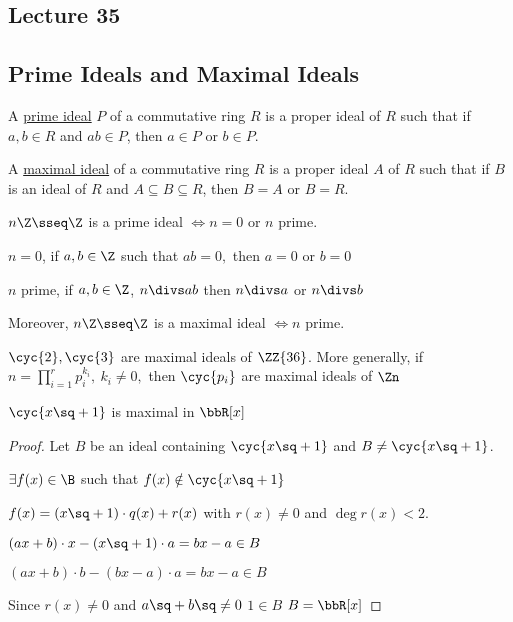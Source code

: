 \subsection*{Lecture 35} %
\subsection{Prime Ideals and Maximal Ideals}

\begin{definition}
  A \ul{prime ideal} \( P \) of a commutative ring \( R \) is a proper ideal of \( R \) such that if \( a,b\in R \) and \( ab\in P \), then \( a\in P \) or \( b\in P \).

  A \ul{maximal ideal} of a commutative ring \( R \) is a proper ideal \( A \) of \( R \) such that if \( B \) is an ideal of \( R \) and \( A\subseteq B\subseteq R \), then \( B=A \) or \( B=R \).
\end{definition}

\begin{example}
  \( n\Z \sseq \Z \) is a prime ideal \( \iff n=0 \) or \( n \) prime.

  \begin{note}
    \( n = 0 \), if \( a,b\in \Z \) such that \( ab = 0, \) then \( a=0 \) or \( b=0 \) \checkmark

    \( n \) prime, if \( a,b\in\Z \), \( n\divs ab \) then \( n\divs a  \) or \( n\divs b \) \checkmark
  \end{note}
  Moreover, \( n\Z\sseq\Z \) is a maximal ideal \( \iff n \) prime.
\end{example}

\begin{example}
  \( \cyc{2}, \cyc{3} \) are maximal ideals of \( \ZZ{36} \). More generally, if \( n=\prod_{i=1}^{r} p_{i}^{k_{i}},\ k_i\neq 0,\) then \( \cyc{p_i} \) are maximal ideals of \( \Zn \)
\end{example}

\begin{example}
  \( \cyc{x\sq +1} \) is maximal in \( \bbR[x] \)
\end{example}

\begin{proof}
  Let \( B \) be an ideal containing \( \cyc{x\sq + 1} \) and \( B\neq \cyc{x\sq + 1} \).

  \imp \( \exists f(x) \in\B \) such that \( f(x) \notin \cyc{x\sq + 1} \)

  \imp \( f(x) = (x\sq+1) \cdot q(x) + r(x) \) with \( r(x)\neq 0 \) and \( \deg r(x) <2 \).

  \imp \( (ax+b) \cdot x - (x\sq+1)\cdot a = bx-a \in B \)

  \imp \( (ax+b) \cdot b - (bx-a)\cdot a = bx-a \in B \)

  Since \( r(x) \neq 0 \) and \( a\sq+b\sq \neq 0 \) \imp \( 1\in B \) \imp \( B = \bbR[x] \)
\end{proof}

